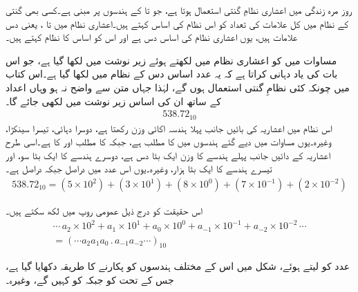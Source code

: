 

روز مرہ زندگی میں اعشاری نظامِ گنتی استعمال ہوتا ہے، جو  تا  کے ہندسوں پر مبنی ہے۔کسی بھی گنتی کے نظام میں کل علامات کی تعداد کو اس نظام کی اساس کہتے ہیں۔اعشاری نظام میں  تا ، یعنی دس  علامات ہیں، یوں اعشاری نظام کی اساس دس ہے اور اس کو اساس  کا نظام کہتے ہیں۔

	مساوات  میں  کو اعشاری نظام میں لکھتے ہوئے زیر نوشت میں  لکھا گیا ہے، جو اس بات کی یاد دہانی کراتا ہے کہ یہ عدد اساس دس کے نظام میں لکھا گیا ہے۔اس کتاب میں چونکہ کئی نظامِ گنتی استعمال ہوں گے، لہٰذا جہاں متن سے واضح نہ ہو وہاں اعداد کے ساتھ ان کی اساس زیر نوشت میں لکھی جائے گا۔
\begin{align}\label{مساوات_ثنائی_عدد}
538.72_{10}
\end{align}
اس نظام میں اعشاریہ کی بائیں جانب پہلا ہندسہ اکائی وزن رکھتا ہے، دوسرا دہائی، تیسرا سینکڑا، وغیرہ۔یوں مساوات  میں دیے گئے ہندسوں میں  کا 
مطلب  ہے، جبکہ  کا مطلب  اور  کا  ہے۔اسی طرح اعشاریہ کے دائیں جانب پہلے ہندسے کا وزن ایک بٹا دس ہے، دوسرے ہندسے کا ایک بٹا سو، اور تیسرے ہندسے کا ایک بٹا ہزار، وغیرہ۔یوں اس عدد میں  دراصل  جبکہ  دراصل  ہے۔
\begin{align}\label{مساوات_ثنائی_سینکڑا}
538.72_{10}=(5\times 10^2)+(3\times 10^1)+(8\times 10^0)+(7\times 10^{-1})+(2\times 10^{-2})
\end{align}

اس حقیقت کو درج ذیل عمومی روپ میں لکھ سکتے ہیں۔
\begin{multline}\label{مساوات_ثنائی_عمومی_روپ}
\cdots \,a_2\times 10^2+a_1\times 10^1+a_0\times 10^0+a_{-1}\times 10^{-1}+a_{-2}\times 10^{-2}\, \cdots\\
=(\cdots a_2a_1a_0\, .\, a_{-1}a_{-2}\cdots)_{10}
\end{multline}

 عدد  کو  لیتے ہوئے، شکل  میں اس کے مختلف ہندسوں کو پکارنے کا طریقہ دکھایا گیا ہے، جس کے تحت  کو  جبکہ  کو  کہیں گے، وغیرہ۔

